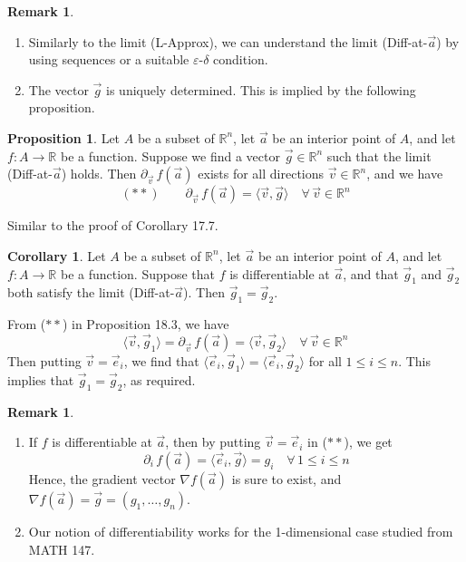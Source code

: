 \documentclass[11pt]{article}
\makeatletter
\theoremstyle{definition}
\newtheorem{prop}[thm]{Proposition}
\newtheorem{cor}[thm]{Corollary}
\newtheorem{remark}[thm]{Remark}
\newcommand{\R}{\ensuremath{\mathbb{R}}}
\newenvironment{pf}[1][\proofname]{\par
  \pushQED{\qed}%
  \normalfont \topsep0\p@\relax
  \trivlist
  \item[\hskip\labelsep\itshape
  #1\@addpunct{.}]\ignorespaces
}{%
  \popQED\endtrivlist\@endpefalse
}
\makeatother
\begin{document}
\begin{remark}~
\vspace{-1.5ex}\begin{enumerate}[(1)]
\item Similarly to the limit (L-Approx), we can understand the limit (Diff-at-$\vec{a}$) by using sequences or a suitable $\varepsilon$-$\delta$ condition.
\item The vector $\vec{g}$ is uniquely determined. This is implied by the following proposition.
\end{enumerate}\vspace{-1.5ex}
\end{remark}

\begin{prop}
Let $A$ be a subset of $\R^n$, let $\vec{a}$ be an interior point of $A$, and let $f : A \to \R$ be a function. Suppose we find a vector $\vec{g} \in \R^n$ such that the limit (Diff-at-$\vec{a}$) holds. Then $\partial_{\vec{v}}\,f(\vec{a})$ exists for all directions $\vec{v} \in \R^n$, and we have
$$(**) \qquad \partial_{\vec{v}}\,f(\vec{a}) = \langle \vec{v}, \vec{g} \rangle \quad \forall \, \vec{v} \in \R^n$$
\begin{pf}
Similar to the proof of Corollary 17.7.
\end{pf}
\end{prop}

\begin{cor}
Let $A$ be a subset of $\R^n$, let $\vec{a}$ be an interior point of $A$, and let $f : A \to \R$ be a function. Suppose that $f$ is differentiable at $\vec{a}$, and that $\vec{g}_1$ and $\vec{g}_2$ both satisfy the limit (Diff-at-$\vec{a}$). Then $\vec{g}_1 = \vec{g}_2$.
\begin{pf}
From ($**$) in Proposition 18.3, we have
$$\langle \vec{v}, \vec{g}_1 \rangle = \partial_{\vec{v}}\,f(\vec{a}) = \langle \vec{v}, \vec{g}_2 \rangle \quad \forall \, \vec{v} \in \R^n$$
Then putting $\vec{v} = \vec{e}_i$, we find that $\langle \vec{e}_i, \vec{g}_1 \rangle = \langle \vec{e}_i, \vec{g}_2 \rangle$ for all $1 \leq i \leq n$. This implies that $\vec{g}_1 = \vec{g}_2$, as required.
\end{pf}
\end{cor}

\begin{remark}~
\vspace{-1.5ex}\begin{enumerate}[(1)]
\item If $f$ is differentiable at $\vec{a}$, then by putting $\vec{v} = \vec{e}_i$ in ($**$), we get
$$\partial_i\,f(\vec{a}) = \langle \vec{e}_i, \vec{g} \rangle = g_i \quad \forall \, 1 \leq i \leq n$$
Hence, the gradient vector $\nabla f(\vec{a})$ is sure to exist, and $\nabla f(\vec{a}) = \vec{g} = (g_1, \dots, g_n)$.
\item Our notion of differentiability works for the 1-dimensional case studied from MATH 147.
\end{enumerate}\vspace{-1.5ex}
\end{remark}
\end{document}
